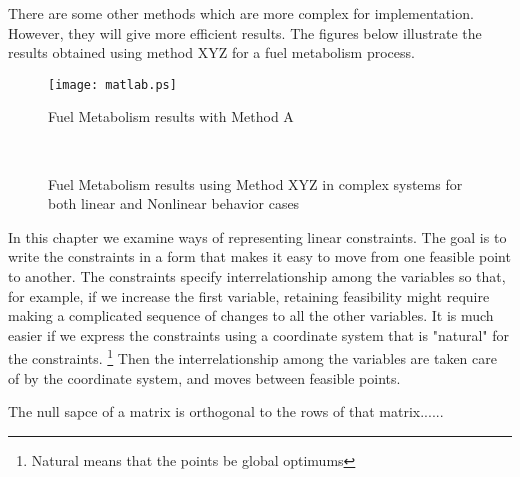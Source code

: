 \documentclass{iitthesis}
\begin{document}
 There are some other methods
which are more complex for implementation. However, they will give
more efficient results. The figures below illustrate the results
obtained using method XYZ for a fuel metabolism process.

\begin{figure}[ht]
  \centering                %
  \scalebox{0.5}            %
  {\texttt{[image: matlab.ps]}}   %
  \caption{Fuel Metabolism results with Method A}        %
  \label{fig:exm}                  %
\end{figure}


\begin{figure}[h]
 \vspace{10pt}
   \centering
 \mbox{\quad
       }
 \caption{Fuel Metabolism results using Method XYZ in complex systems for both linear and Nonlinear behavior cases}
 \label{fig:SubF}
 \end{figure}


\clearpage



In this chapter we examine ways of representing linear
constraints. The goal is to write the constraints in a form that
makes it easy to move from one feasible point to another. The
constraints specify interrelationship among the variables so that,
for example, if we increase the first variable, retaining
feasibility might require making a complicated sequence of changes
to all the other variables. It is much easier if we express the
constraints using a coordinate system that is "natural" for the
constraints. \footnote{Natural means that the points be global
optimums} Then the interrelationship among the variables are taken
care of by the coordinate system, and moves between feasible
points.


The null sapce of a matrix is orthogonal to the rows of that
matrix......

\end{document}
